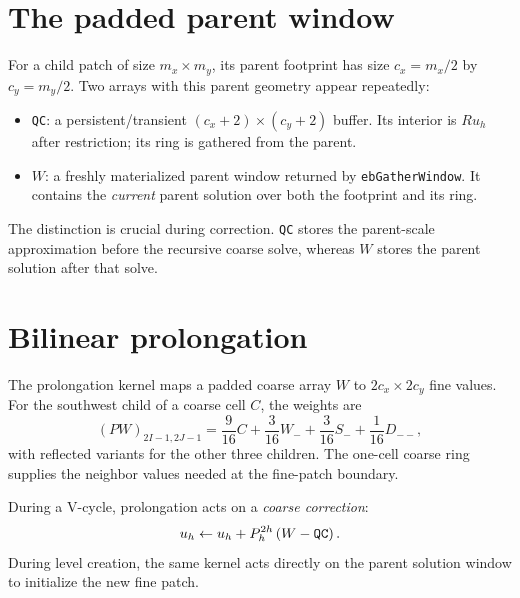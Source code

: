\documentclass[11pt,oneside,openany]{book}
\newcommand{\code}[1]{\textnormal{\texttt{#1}}}
\begin{document}
\section{The padded parent window}
For a child patch of size $m_x\times m_y$, its parent footprint has size
$c_x=m_x/2$ by $c_y=m_y/2$. Two arrays with this parent geometry appear repeatedly:
\begin{itemize}
\item \code{QC}: a persistent/transient $(c_x+2)\times(c_y+2)$ buffer. Its interior is $Ru_h$ after restriction; its ring is gathered from the parent.
\item $W$: a freshly materialized parent window returned by \code{ebGatherWindow}. It contains the \emph{current} parent solution over both the footprint and its ring.
\end{itemize}

The distinction is crucial during correction. \code{QC} stores the parent-scale approximation before the recursive coarse solve, whereas $W$ stores the parent solution after that solve.

\section{Bilinear prolongation}
The prolongation kernel maps a padded coarse array $W$ to $2c_x\times2c_y$ fine values. For the southwest child of a coarse cell $C$, the weights are
\begin{equation}
  (PW)_{2I-1,2J-1}
  =\frac{9}{16}C+\frac{3}{16}W_-+\frac{3}{16}S_-+\frac{1}{16}D_{--},
  \label{eq:prolong}
\end{equation}
with reflected variants for the other three children. The one-cell coarse ring supplies the neighbor values needed at the fine-patch boundary.

During a V-cycle, prolongation acts on a \emph{coarse correction}:
\begin{equation}
  u_h\leftarrow u_h+P_h^{2h}\left(W-\code{QC}\right).
  \label{eq:correction}
\end{equation}
During level creation, the same kernel acts directly on the parent solution window to initialize the new fine patch.
\end{document}
